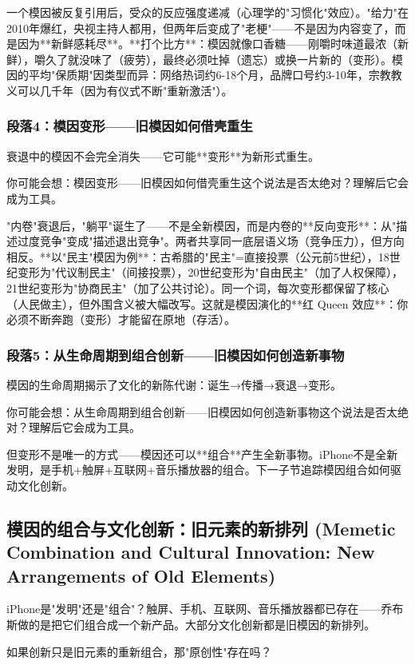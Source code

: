 \documentclass[openany, a4paper, 12pt]{book}
\newenvironment{motivation}{
	\vspace{0.5em}
	\begin{tcolorbox}[
		colback=gray!10,           %
		colframe=gray!60,          %
		title=\textit{本章动机 (Motivation)},
		fonttitle=\bfseries,
		arc=0mm,                   %
		leftrule=3mm               %
		]
		\small \itshape %
	}{
	\end{tcolorbox}
	\vspace{1em}
}
\begin{document}
\begin{motivation}
\begin{motivation}
\begin{motivation}
一个模因被反复引用后，受众的反应强度递减（心理学的"习惯化"效应）。"给力"在2010年爆红，央视主持人都用，但两年后变成了"老梗"——不是因为内容变了，而是因为**新鲜感耗尽**。**打个比方**：模因就像口香糖——刚嚼时味道最浓（新鲜），嚼久了就没味了（疲劳），最终必须吐掉（遗忘）或换一片新的（变形）。模因的平均"保质期"因类型而异：网络热词约6-18个月，品牌口号约3-10年，宗教教义可以几千年（因为有仪式不断"重新激活"）。

	\subsubsection*{段落4：模因变形——旧模因如何借壳重生}
衰退中的模因不会完全消失——它可能**变形**为新形式重生。
	\begin{tcolorbox}[colback=yellow!5, title=\textit{读者行为预测}]
		你可能会想：模因变形——旧模因如何借壳重生这个说法是否太绝对？理解后它会成为工具。
	\end{tcolorbox}

"内卷"衰退后，"躺平"诞生了——不是全新模因，而是内卷的**反向变形**：从"描述过度竞争"变成"描述退出竞争"。两者共享同一底层语义场（竞争压力），但方向相反。**以"民主"模因为例**：古希腊的"民主"=直接投票（公元前5世纪），18世纪变形为"代议制民主"（间接投票），20世纪变形为"自由民主"（加了人权保障），21世纪变形为"协商民主"（加了公共讨论）。同一个词，每次变形都保留了核心（人民做主），但外围含义被大幅改写。这就是模因演化的**红 Queen 效应**：你必须不断奔跑（变形）才能留在原地（存活）。

	\subsubsection*{段落5：从生命周期到组合创新——旧模因如何创造新事物}
模因的生命周期揭示了文化的新陈代谢：诞生→传播→衰退→变形。
	\begin{tcolorbox}[colback=yellow!5, title=\textit{读者行为预测}]
		你可能会想：从生命周期到组合创新——旧模因如何创造新事物这个说法是否太绝对？理解后它会成为工具。
	\end{tcolorbox}

但变形不是唯一的方式——模因还可以**组合**产生全新事物。iPhone不是全新发明，是手机+触屏+互联网+音乐播放器的组合。下一子节追踪模因组合如何驱动文化创新。

\subsection{模因的组合与文化创新：旧元素的新排列 (Memetic Combination and Cultural Innovation: New Arrangements of Old Elements)}
\begin{motivation}
		iPhone是"发明"还是"组合"？触屏、手机、互联网、音乐播放器都已存在——乔布斯做的是把它们组合成一个新产品。大部分文化创新都是旧模因的新排列。
	\end{motivation}
\begin{questionbox}
	如果创新只是旧元素的重新组合，那"原创性"存在吗？
\end{questionbox}


\end{motivation}
\end{motivation}
\end{motivation}
\end{document}
